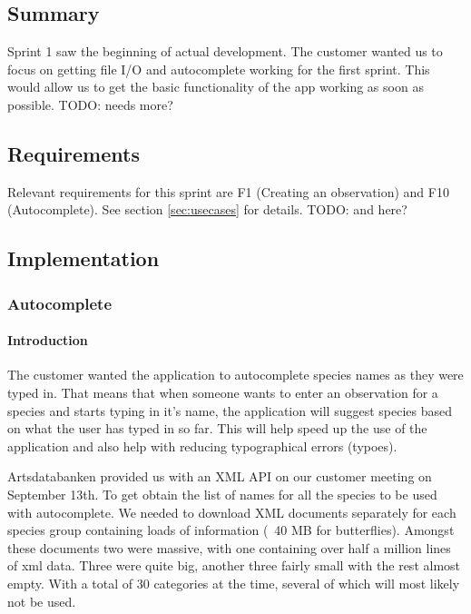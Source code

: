 \subsection{Summary}

	Sprint 1 saw the beginning of actual development. The customer wanted us to focus on getting file I/O and autocomplete working for the first sprint. This would allow us to get the basic functionality of the app working as soon as possible.
	TODO: needs more?

\subsection{Requirements}

	Relevant requirements for this sprint are F1 (Creating an observation) and F10 (Autocomplete). See section \ref{sec:usecases} for details.
	TODO: and here?

\subsection{Implementation}

	\subsubsection{Autocomplete}

		\paragraph{Introduction}
		The customer wanted the application to autocomplete species names as they were typed in. 
		That means that when someone wants to enter an observation for a species and starts typing in it's name, the application will suggest species based on what the user has typed in so far. 
		This will help speed up the use of the application and also help with reducing typographical errors (typoes).

		Artsdatabanken provided us with an XML API on our customer meeting on September 13th. 
		To get obtain the list of names for all the species to be used with autocomplete. 
		We needed to download XML documents separately for each species group containing loads of information (~40 MB for butterflies).
		Amongst these documents two were massive, with one containing over half a million lines of xml data. 
		Three were quite big, another three fairly small with the rest almost empty. With a total of 30 categories at the time, several of which will most likely not be used.

